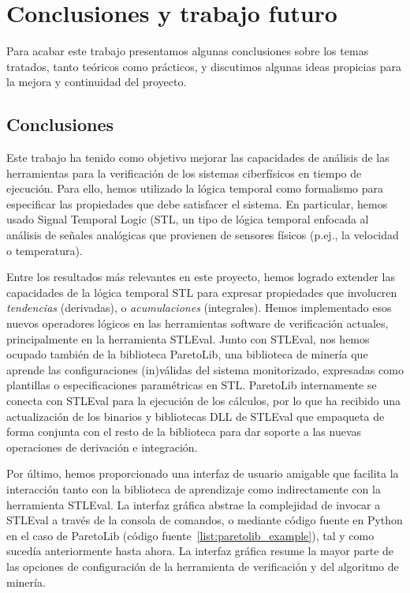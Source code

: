 \chapter{Conclusiones y trabajo futuro}
\label{cha:concl}
Para acabar este trabajo presentamos algunas conclusiones sobre los temas tratados, tanto teóricos como prácticos, y discutimos algunas ideas propicias para la mejora y continuidad del proyecto.

\section{Conclusiones}
Este trabajo ha tenido como objetivo mejorar las capacidades de análisis de las herramientas para la verificación de los sistemas ciberfísicos en tiempo de ejecución. Para ello, hemos utilizado la lógica temporal como formalismo para especificar las propiedades que debe satisfacer el sistema. En particular, hemos usado Signal Temporal Logic (STL, un tipo de lógica temporal enfocada al análisis de señales analógicas que provienen de sensores físicos (p.ej., la velocidad o temperatura).

Entre los resultados más relevantes en este proyecto, hemos logrado extender las capacidades de la lógica temporal STL para expresar propiedades que involucren \textit{tendencias} (derivadas), o \textit{acumulaciones} (integrales). Hemos implementado esos nuevos operadores lógicos en las herramientas software de verificación actuales, principalmente en la herramienta STLEval. Junto con STLEval, nos hemos ocupado también de la biblioteca ParetoLib, una biblioteca de minería que aprende las configuraciones (in)válidas del sistema monitorizado, expresadas como plantillas o especificaciones paramétricas en STL. ParetoLib internamente se conecta con STLEval para la ejecución de los cálculos, por lo que ha recibido una actualización de los binarios y bibliotecas DLL de STLEval que empaqueta de forma conjunta con el resto de la biblioteca para dar soporte a las nuevas operaciones de derivación e integración.

Por último, hemos proporcionado una interfaz de usuario amigable que facilita la interacción tanto con la biblioteca de aprendizaje como indirectamente con la herramienta STLEval. La interfaz gráfica abstrae la complejidad de invocar a STLEval a través de la consola de comandos, o mediante código fuente en Python en el caso de ParetoLib (código fuente~\ref{list:paretolib_example}), tal y como sucedía anteriormente hasta ahora. La interfaz gráfica resume la mayor parte de las opciones de configuración de la herramienta de verificación y del algoritmo de minería.

